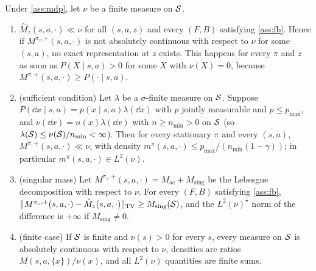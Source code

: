 \begin{proposition}\label{prop:fb-dom}
Under \cref{ass:mdp}, let $\nu$ be a finite measure on $\mathcal{S}$.
\begin{enumerate}[nosep,label=(\alph*)]
\item $\hat M_z(s,a,\cdot)\ll\nu$ for all $(s,a,z)$ and every $(F,B)$ satisfying \cref{ass:fb}.
  Hence if $M^{\pi_z,+}(s,a,\cdot)$ is not absolutely continuous with respect to $\nu$ for some $(s,a)$, no exact representation at $z$ exists.
  This happens for every $\pi$ and $z$ as soon as $P(X\mid s,a)>0$ for some $X$ with $\nu(X)=0$, because $M^{\pi,+}(s,a,\cdot)\ge P(\cdot\mid s,a)$.
\item (sufficient condition) Let $\lambda$ be a $\sigma$-finite measure on $\mathcal{S}$.
  Suppose $P(\dd x\mid s,a)=p(x\mid s,a)\lambda(\dd x)$ with $p$ jointly measurable and $p\le p_{\max}$, and $\nu(\dd x)=n(x)\lambda(\dd x)$ with $n\ge n_{\min}>0$ on $\mathcal{S}$ (so $\lambda(\mathcal{S})\le\nu(\mathcal{S})/n_{\min}<\infty$).
  Then for every stationary $\pi$ and every $(s,a)$, $M^{\pi,+}(s,a,\cdot)\ll\nu$, with density $m^\pi(s,a,\cdot)\le p_{\max}/(n_{\min}(1-\gamma))$; in particular $m^\pi(s,a,\cdot)\in L^2(\nu)$.
\item (singular mass) Let $M^{\pi_z,+}(s,a,\cdot)=M_{\mathrm{ac}}+M_{\mathrm{sing}}$ be the Lebesgue decomposition with respect to $\nu$.
  For every $(F,B)$ satisfying \cref{ass:fb}, $\|M^{\pi_z,+}(s,a,\cdot)-\hat M_z(s,a,\cdot)\|_{\mathrm{TV}}\ge M_{\mathrm{sing}}(\mathcal{S})$, and the $L^2(\nu)^\star$ norm of the difference is $+\infty$ if $M_{\mathrm{sing}}\ne0$.
\item (finite case) If $\mathcal{S}$ is finite and $\nu(s)>0$ for every $s$, every measure on $\mathcal{S}$ is absolutely continuous with respect to $\nu$, densities are ratios $M(s,a,\{x\})/\nu(x)$, and all $L^2(\nu)$ quantities are finite sums.
\end{enumerate}
\end{proposition}
